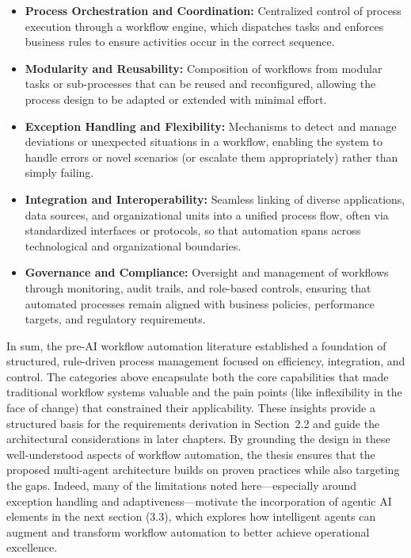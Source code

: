 \begin{itemize}
  \item \textbf{Process Orchestration and Coordination:} Centralized control of process execution through a workflow engine, which dispatches tasks and enforces business rules to ensure activities occur in the correct sequence.
  \item \textbf{Modularity and Reusability:} Composition of workflows from modular tasks or sub-processes that can be reused and reconfigured, allowing the process design to be adapted or extended with minimal effort.
  \item \textbf{Exception Handling and Flexibility:} Mechanisms to detect and manage deviations or unexpected situations in a workflow, enabling the system to handle errors or novel scenarios (or escalate them appropriately) rather than simply failing.
  \item \textbf{Integration and Interoperability:} Seamless linking of diverse applications, data sources, and organizational units into a unified process flow, often via standardized interfaces or protocols, so that automation spans across technological and organizational boundaries.
  \item \textbf{Governance and Compliance:} Oversight and management of workflows through monitoring, audit trails, and role-based controls, ensuring that automated processes remain aligned with business policies, performance targets, and regulatory requirements.
\end{itemize}

In sum, the pre-AI workflow automation literature established a foundation of structured, rule-driven process management focused on efficiency, integration, and control. The categories above encapsulate both the core capabilities that made traditional workflow systems valuable and the pain points (like inflexibility in the face of change) that constrained their applicability. These insights provide a structured basis for the requirements derivation in Section~2.2 and guide the architectural considerations in later chapters. By grounding the design in these well-understood aspects of workflow automation, the thesis ensures that the proposed multi-agent architecture builds on proven practices while also targeting the gaps. Indeed, many of the limitations noted here---especially around exception handling and adaptiveness---motivate the incorporation of agentic AI elements in the next section (3.3), which explores how intelligent agents can augment and transform workflow automation to better achieve operational excellence.


